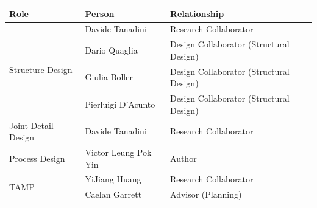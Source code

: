 \documentclass[11pt]{book}
\begin{document}
\begin{table}[H]
\begin{adjustbox}{max width=\textwidth}
\begin{tabular}{p{3.49cm}p{3.79cm}p{8.59cm}}
\hline
\multicolumn{1}{|p{3.49cm}}{{\footnotesize \textbf{Role}}} & 
\multicolumn{1}{|p{3.79cm}}{{\footnotesize \textbf{Person}}} & 
\multicolumn{1}{|p{8.59cm}|}{{\footnotesize \textbf{Relationship}}} \\ 
\hline
\multicolumn{1}{|p{3.49cm}}{\multirow{4}{*}{\parbox{3.49cm}{{\footnotesize Structure Design}}}} & 
\multicolumn{1}{|p{3.79cm}}{{\footnotesize Davide Tanadini}} & 
\multicolumn{1}{|p{8.59cm}|}{{\footnotesize Research Collaborator}} \\ 
\hhline{~--}
\multicolumn{1}{|p{3.49cm}}{} & 
\multicolumn{1}{|p{3.79cm}}{{\footnotesize Dario Quaglia}} & 
\multicolumn{1}{|p{8.59cm}|}{{\footnotesize Design Collaborator (Structural Design)}} \\ 
\hhline{~--}
\multicolumn{1}{|p{3.49cm}}{} & 
\multicolumn{1}{|p{3.79cm}}{{\footnotesize Giulia Boller}} & 
\multicolumn{1}{|p{8.59cm}|}{{\footnotesize Design Collaborator (Structural Design)}} \\ 
\hhline{~--}
\multicolumn{1}{|p{3.49cm}}{} & 
\multicolumn{1}{|p{3.79cm}}{{\footnotesize Pierluigi D’Acunto}} & 
\multicolumn{1}{|p{8.59cm}|}{{\footnotesize Design Collaborator (Structural Design)}} \\ 
\hline
\multicolumn{1}{|p{3.49cm}}{{\footnotesize Joint Detail Design}} & 
\multicolumn{1}{|p{3.79cm}}{{\footnotesize Davide Tanadini}} & 
\multicolumn{1}{|p{8.59cm}|}{{\footnotesize Research Collaborator}} \\ 
\hline
\multicolumn{1}{|p{3.49cm}}{{\footnotesize Process Design}} & 
\multicolumn{1}{|p{3.79cm}}{{\footnotesize Victor Leung Pok Yin}} & 
\multicolumn{1}{|p{8.59cm}|}{{\footnotesize Author}} \\ 
\hline
\multicolumn{1}{|p{3.49cm}}{\multirow{2}{*}{\parbox{3.49cm}{{\footnotesize TAMP}}}} & 
\multicolumn{1}{|p{3.79cm}}{{\footnotesize YiJiang Huang}} & 
\multicolumn{1}{|p{8.59cm}|}{{\footnotesize Research Collaborator}} \\ 
\hhline{~--}
\multicolumn{1}{|p{3.49cm}}{} & 
\multicolumn{1}{|p{3.79cm}}{{\footnotesize Caelan Garrett}} & 
\multicolumn{1}{|p{8.59cm}|}{{\footnotesize Advisor (Planning)}} \\ 
\hline
\end{tabular}
\end{adjustbox}
\end{table}
\vspace{5\baselineskip}
\end{document}
